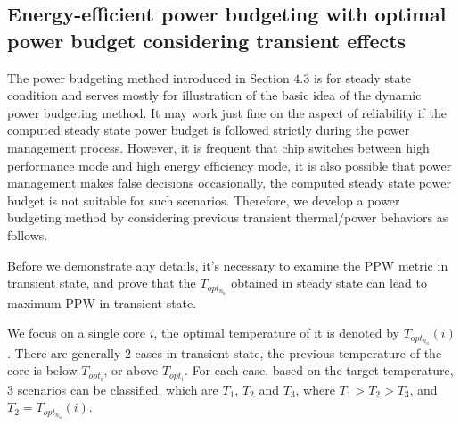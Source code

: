 \subsection{Energy-efficient power budgeting with optimal power budget considering transient effects}
The power budgeting method introduced in Section $4.3$ is for steady state condition and serves mostly for illustration of the basic idea of the dynamic power budgeting method. It may work just fine on the aspect of reliability if the computed steady state power budget is followed strictly during the power management process. However, it is frequent that chip switches between high performance mode and high energy efficiency mode, it is also possible that power management makes false decisions occasionally, the computed steady state power budget is not suitable for such scenarios. Therefore, we develop a power budgeting method by considering previous transient thermal/power behaviors as follows.

Before we demonstrate any details, it's necessary to examine the PPW metric in transient state, and prove that the $T_{opt_{n_{a}}}$ obtained in steady state can lead to maximum PPW in transient state.

We focus on a single core $i$, the optimal temperature of it is denoted by $T_{opt_{n_{a}}}(i)$. There are generally $2$ cases in transient state, the previous temperature of the core is below $T_{opt_{i}}$, or above $T_{opt_{i}}$. For each case, based on the target temperature, $3$ scenarios can be classified, which are $T_{1}$, $T_{2}$ and $T_{3}$, where $T_{1}>T_{2}>T_{3}$, and $T_{2} = T_{opt_{n_{a}}}(i)$.


